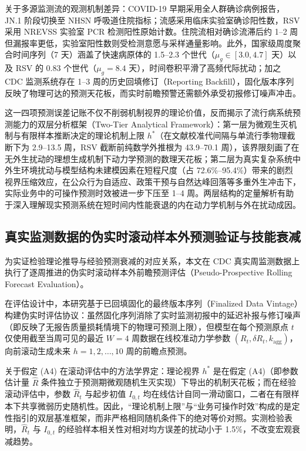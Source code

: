 \documentclass[11pt,a4paper]{article}
\theoremstyle{plain}
\theoremstyle{definition}
\begin{document}
关于多源监测流的观测机制差异：COVID-19 早期采用全人群确诊病例报告，JN.1 阶段切换至 NHSN 呼吸道住院指标；流感采用临床实验室确诊阳性数，RSV 采用 NREVSS 实验室 PCR 检测阳性原始计数。住院流相对确诊流滞后约 1--2 周但漏报率更低，实验室阳性数则受检测意愿与采样通量影响。此外，国家级周度聚合时间序列（7 天）涵盖了快速病原体的 1.5--2.3 个世代（$\mu_g \in [3.0, 4.7]$ 天）以及 RSV 的 0.83 个世代（$\mu_g = 8.4$ 天），时间卷积平滑了高频代际扰动；加之 CDC 监测系统存在 1--3 周的历史回填修订（Reporting Backfill），固化版本序列反映了物理可达的预测天花板，而实时前瞻预警还需额外承受初报修订噪声冲击。

这一四项预测误差记账不仅不削弱机制视界的理论价值，反而揭示了流行病系统预测能力的双层分析框架（Two-Tier Analytical Framework）：第一层为微观生灭机制与有限样本推断决定的理论机制上限 $h^*$（在文献校准代间隔与单流行季物理截断下为 2.9--13.5 周，RSV 截断前纯数学外推根为 43.9--70.1 周），该界限刻画了在无外生扰动的理想生成机制下动力学预测的数理天花板；第二层为真实复杂系统中外生环境扰动与模型结构未建模因素在短程尺度（占 72.6\%--95.4\%）带来的剧烈视界压缩效应，在公众行为自适应、政策干预与自然达峰回落等多重外生冲击下，实际业务中的可操作预测时效被进一步下压至 1--4 周。两层结构的定量解析有助于深入理解现实预测系统在短时间内性能衰退的内在动力学机制与外在扰动成因。


\subsection{真实监测数据的伪实时滚动样本外预测验证与技能衰减}\label{sec:rolling_eval}

为实证检验理论推导与经验预测衰减的对应关系，本文在 CDC 真实周监测数据上执行了逐周推进的伪实时滚动样本外前瞻预测评估（Pseudo-Prospective Rolling Forecast Evaluation）。

在评估设计中，本研究基于已回填固化的最终版本序列（Finalized Data Vintage）构建伪实时评估协议：虽然固化序列消除了实时监测初报中的延迟补报与修订噪声（即反映了无报告质量损耗情境下的物理可预测上限\citep{mcdonald2021auxiliary}），但模型在每个预测原点 $t$ 仅使用截至当周可见的最近 $W=4$ 周数据在线校准动力学参数 $(R_t, \delta R_t, k_{\text{agg}})$，向前滚动生成未来 $h = 1, 2, \dots, 10$ 周的前瞻点预测。

关于假定 (A4) 在滚动评估中的方法学界定：理论视界 $h^*$ 是在假定 (A4)（即参数估计量 $\hat{R}$ 条件独立于预测期微观随机生灭实现）下导出的机制天花板；而在经验滚动评估中，参数 $\hat{R}_t$ 与起步初值 $I_{0,t}$ 均在线估计自同一滑动窗口，二者在有限样本下共享微弱历史随机性。因此，“理论机制上限”与“业务可操作时效”构成的是定性指引的双层基准框架，而非严格相同随机条件下的绝对等价对照。实测检验表明，$\hat{R}_t$ 与 $I_{0,t}$ 的经验样本相关性对相对均方误差的扰动小于 1.5\%，不改变宏观衰减趋势。
\end{document}
